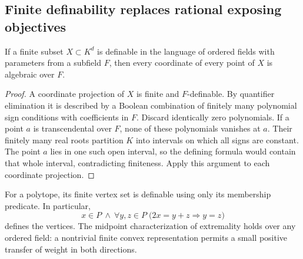 \documentclass[11pt,a4paper]{article}
\numberwithin{equation}{section}
\theoremstyle{plain}
\begin{document}
\subsection{Finite definability replaces rational exposing objectives}
\begin{lemma}\label{poly:ic:lem:finite}
If a finite subset $X\subset K^d$ is definable in the language of ordered
fields with parameters from a subfield $F$, then every coordinate of
every point of $X$ is algebraic over $F$.
\end{lemma}
\begin{proof}
A coordinate projection of $X$ is finite and $F$-definable. By quantifier
elimination it is described by a Boolean combination of finitely many
polynomial sign conditions with coefficients in $F$. Discard identically
zero polynomials. If a point $a$ is transcendental over $F$, none of these
polynomials vanishes at $a$. Their finitely many real roots partition
$K$ into intervals on which all signs are constant. The point $a$ lies
in one such open interval, so the defining formula would contain that
whole interval, contradicting finiteness. Apply this argument to each
coordinate projection.
\end{proof}

For a polytope, its finite vertex set is definable using only its membership
predicate. In particular,
\begin{equation}\label{poly:ic:eq:vertexformula}
 x\in P\ \wedge\
 \forall y,z\in P\;\bigl(2x=y+z\Longrightarrow y=z\bigr)
\end{equation}
defines the vertices. The midpoint characterization of extremality holds
over any ordered field: a nontrivial finite convex representation permits
a small positive transfer of weight in both directions.
\end{document}
